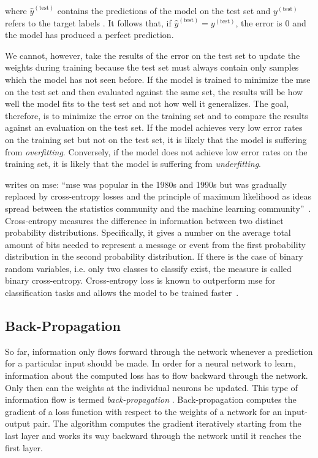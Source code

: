\documentclass[draft,final]{vutinfth} %
\begin{document}
where $\hat{y}^{(\mathrm{test})}$ contains the predictions of the
model on the test set and $y^{(\mathrm{test})}$ refers to the target
labels \cite{goodfellow2016}. It follows that, if
$\hat{y}^{(\mathrm{test})} = y^{(\mathrm{test})}$, the error is $0$
and the model has produced a perfect prediction.

We cannot, however, take the results of the error on the test set to
update the weights during training because the test set must always
contain only samples which the model has not seen before. If the model
is trained to minimize the \gls{mse} on the test set and then
evaluated against the same set, the results will be how well the model
fits to the test set and not how well it generalizes. The goal,
therefore, is to minimize the error on the training set and to compare
the results against an evaluation on the test set. If the model
achieves very low error rates on the training set but not on the test
set, it is likely that the model is suffering from
\emph{overfitting}. Conversely, if the model does not achieve low
error rates on the training set, it is likely that the model is
suffering from \emph{underfitting}.

\textcite{goodfellow2016} writes on \gls{mse}: ``\gls{mse} was popular
in the 1980s and 1990s but was gradually replaced by cross-entropy
losses and the principle of maximum likelihood as ideas spread between
the statistics community and the machine learning
community''~\cite[p.222]{goodfellow2016}. Cross-entropy measures the
difference in information between two distinct probability
distributions. Specifically, it gives a number on the average total
amount of bits needed to represent a message or event from the first
probability distribution in the second probability distribution. If
there is the case of binary random variables, i.e. only two classes to
classify exist, the measure is called binary
cross-entropy. Cross-entropy loss is known to outperform \gls{mse} for
classification tasks and allows the model to be trained
faster~\cite{simard2003}.

\subsection{Back-Propagation}
\label{ssec:theory-back-propagation}

So far, information only flows forward through the network whenever a
prediction for a particular input should be made. In order for a
neural network to learn, information about the computed loss has to
flow backward through the network. Only then can the weights at the
individual neurons be updated. This type of information flow is termed
\emph{back-propagation} \cite{rumelhart1986}. Back-propagation
computes the gradient of a loss function with respect to the weights
of a network for an input-output pair. The algorithm computes the
gradient iteratively starting from the last layer and works its way
backward through the network until it reaches the first layer.
\end{document}
